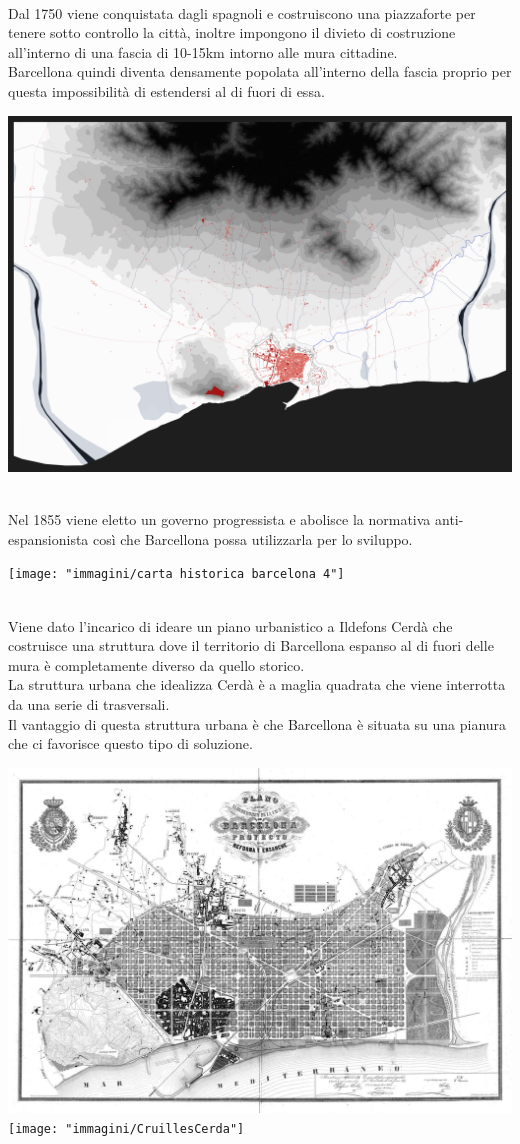 \documentclass[a4paper,12pt, oneside]{book}
\begin{document}
    \leavevmode\\
    Dal 1750 viene conquistata dagli spagnoli e costruiscono una piazzaforte per tenere sotto controllo la città, inoltre impongono il divieto di costruzione all'interno di una fascia di 10-15km intorno alle mura cittadine.\\
    Barcellona quindi diventa densamente popolata all'interno della fascia proprio per questa impossibilità di estendersi al di fuori di essa.\\
    \begin{center}
    	\includegraphics[width=0.6\linewidth]{"immagini/carta historica barcelona 3"}
    	\label{fig:barcelona3}
    \end{center}
    \leavevmode\\
    Nel 1855 viene eletto un governo progressista e abolisce la normativa anti-espansionista così che Barcellona possa utilizzarla per lo sviluppo.\\
    \begin{center}
    	\texttt{[image: "immagini/carta historica barcelona 4"]}
    	\label{fig:barcelona4}
    \end{center}
    \leavevmode\\
    Viene dato l'incarico di ideare un piano urbanistico a Ildefons Cerdà che costruisce una struttura dove il territorio di Barcellona espanso al di fuori delle mura è completamente diverso da quello storico.\\
    La struttura urbana che idealizza Cerdà è a maglia quadrata che viene interrotta da una serie di trasversali.\\
    Il vantaggio di questa struttura urbana è che Barcellona è situata su una pianura che ci favorisce questo tipo di soluzione.\\
    \begin{center}
    	\includegraphics[width=0.6\linewidth]{"immagini/ildefonscerdaspain"}
    	\texttt{[image: "immagini/CruillesCerda"]}
    	\label{fig:cerda}
    \end{center}
\end{document}
